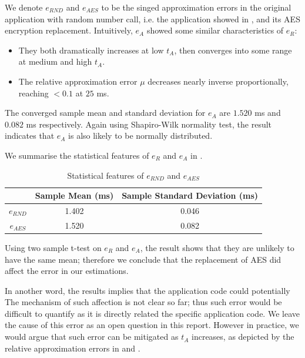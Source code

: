 We denote $e_{RND}$ and $e_{AES}$ to be the singed approximation errors in the original application with random number call, i.e. the application showed in , and its AES encryption replacement. Intuitively, $e_A$ showed some similar characteristics of $e_R$:

\begin{itemize}
	\item They both dramatically increases at low $t_A$, then converges into some range at medium and high $t_A$.
	\item The relative approximation error $\mu$ decreases nearly inverse proportionally, reaching $<0.1$ at $25$ ms.
\end{itemize}

The converged sample mean and standard deviation for $e_A$ are $1.520$ ms and $0.082$ ms respectively. Again using Shapiro-Wilk normality test, the result indicates that $e_A$ is also likely to be normally distributed.

We summarise the statistical features of $e_R$ and $e_A$ in .

\begin{table}
	\center
	\begin{tabular}{|c|c|c|}
	\hline
	      & Sample Mean (ms) & Sample Standard Deviation (ms) \\ \hline
	$e_{RND}$ & 1.402            & 0.046                          \\ \hline
	$e_{AES}$ & 1.520            & 0.082                          \\ \hline
	\end{tabular}
	\caption{Statistical features of $e_{RND}$ and $e_{AES}$}
	\label{Tbl: Statistical features of eR and eA}
\end{table}

Using two sample t-test on $e_R$ and $e_A$, the result shows that they are unlikely to have the same mean; therefore we conclude that the replacement of AES did affect the error in our estimations. 

In another word, the results implies that the application code could potentially The mechanism of such affection is not clear so far; thus such error would be difficult to quantify as it is directly related the specific application code. We leave the cause of this error as an open question in this report. However in practice, we would argue that such error can be mitigated as $t_A$ increases, as depicted by the relative approximation errors in  and .

